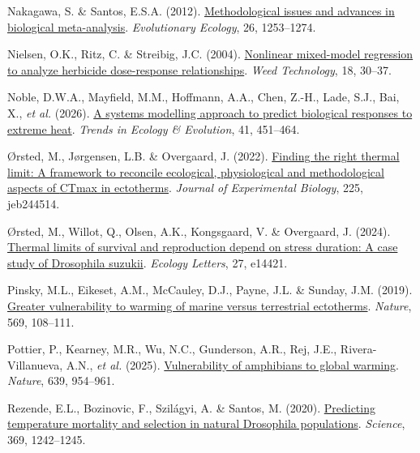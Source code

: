 \documentclass[
  11pt,
]{article}
\newlength{\cslhangindent}
\newenvironment{CSLReferences}[2] %
 {\begin{list}{}{%
  \setlength{\itemindent}{0pt}
  \setlength{\leftmargin}{0pt}
  \setlength{\parsep}{0pt}
  \ifodd #1
   \setlength{\leftmargin}{\cslhangindent}
   \setlength{\itemindent}{-1\cslhangindent}
  \fi
  \setlength{\itemsep}{#2\baselineskip}}}
 {\end{list}}
\begin{document}
\begin{CSLReferences}{1}{0}
Nakagawa, S. \& Santos, E.S.A. (2012).
\href{https://doi.org/10.1007/s10682-012-9555-5}{Methodological issues
and advances in biological meta-analysis}. \emph{Evolutionary Ecology},
26, 1253--1274.

Nielsen, O.K., Ritz, C. \& Streibig, J.C. (2004).
\href{https://doi.org/10.1614/WT-03-070R1}{Nonlinear mixed-model
regression to analyze herbicide dose-response relationships}. \emph{Weed
Technology}, 18, 30--37.

Noble, D.W.A., Mayfield, M.M., Hoffmann, A.A., Chen, Z.-H., Lade, S.J.,
Bai, X., \emph{et al.} (2026).
\href{https://doi.org/10.1016/j.tree.2026.01.009}{A systems modelling
approach to predict biological responses to extreme heat}. \emph{Trends
in Ecology \& Evolution}, 41, 451--464.

Ørsted, M., Jørgensen, L.B. \& Overgaard, J. (2022).
\href{https://doi.org/10.1242/jeb.244514}{Finding the right thermal
limit: A framework to reconcile ecological, physiological and
methodological aspects of {CTmax} in ectotherms}. \emph{Journal of
Experimental Biology}, 225, jeb244514.

Ørsted, M., Willot, Q., Olsen, A.K., Kongsgaard, V. \& Overgaard, J.
(2024). \href{https://doi.org/10.1111/ele.14421}{Thermal limits of
survival and reproduction depend on stress duration: A case study of
{Drosophila} suzukii}. \emph{Ecology Letters}, 27, e14421.

Pinsky, M.L., Eikeset, A.M., McCauley, D.J., Payne, J.L. \& Sunday, J.M.
(2019). \href{https://doi.org/10.1038/s41586-019-1132-4}{Greater
vulnerability to warming of marine versus terrestrial ectotherms}.
\emph{Nature}, 569, 108--111.

Pottier, P., Kearney, M.R., Wu, N.C., Gunderson, A.R., Rej, J.E.,
Rivera-Villanueva, A.N., \emph{et al.} (2025).
\href{https://doi.org/10.1038/s41586-025-08665-0}{Vulnerability of
amphibians to global warming}. \emph{Nature}, 639, 954--961.

Rezende, E.L., Bozinovic, F., Szilágyi, A. \& Santos, M. (2020).
\href{https://doi.org/10.1126/science.aba9287}{Predicting temperature
mortality and selection in natural {Drosophila} populations}.
\emph{Science}, 369, 1242--1245.


\end{CSLReferences}
\end{document}
